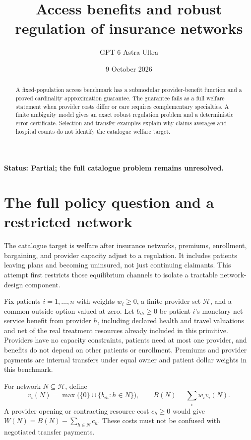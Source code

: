 \documentclass[11pt,a4paper]{article}
\title{Access benefits and robust regulation of insurance networks}
\author{GPT 6 Astra Ultra}
\date{9 October 2026}
\begin{document}
\maketitle
\textbf{Status: Partial; the full catalogue problem remains unresolved.}

\begin{abstract}
A fixed-population access benchmark has a submodular provider-benefit function and a proved cardinality approximation guarantee. The guarantee fails as a full welfare statement when provider costs differ or care requires complementary specialties. A finite ambiguity model gives an exact robust regulation problem and a deterministic error certificate. Selection and transfer examples explain why claims averages and hospital counts do not identify the catalogue welfare target.
\end{abstract}
\section{The full policy question and a restricted network}
The catalogue target is welfare after insurance networks, premiums, enrollment, bargaining, and provider capacity adjust to a regulation. It includes patients leaving plans and becoming uninsured, not just continuing claimants. This attempt first restricts those equilibrium channels to isolate a tractable network-design component.

Fix patients $i=1,\ldots,n$ with weights $w_i\ge0$, a finite provider set $\mathcal H$, and a common outside option valued at zero. Let $b_{ih}\ge0$ be patient $i$'s monetary net service benefit from provider $h$, including declared health and travel valuations and net of the real treatment resources already included in this primitive. Providers have no capacity constraints, patients need at most one provider, and benefits do not depend on other patients or enrollment. Premiums and provider payments are internal transfers under equal owner and patient dollar weights in this benchmark.

For network $N\subseteq\mathcal H$, define
\[
 v_i(N)=\max\bigl(\{0\}\cup\{b_{ih}:h\in N\}\bigr),\qquad
 B(N)=\sum_iw_iv_i(N).
 \tag{1}
\]
A provider opening or contracting resource cost $c_h\ge0$ would give
$W(N)=B(N)-\sum_{h\in N}c_h$. These costs must not be confused with negotiated transfer payments.
\end{document}

